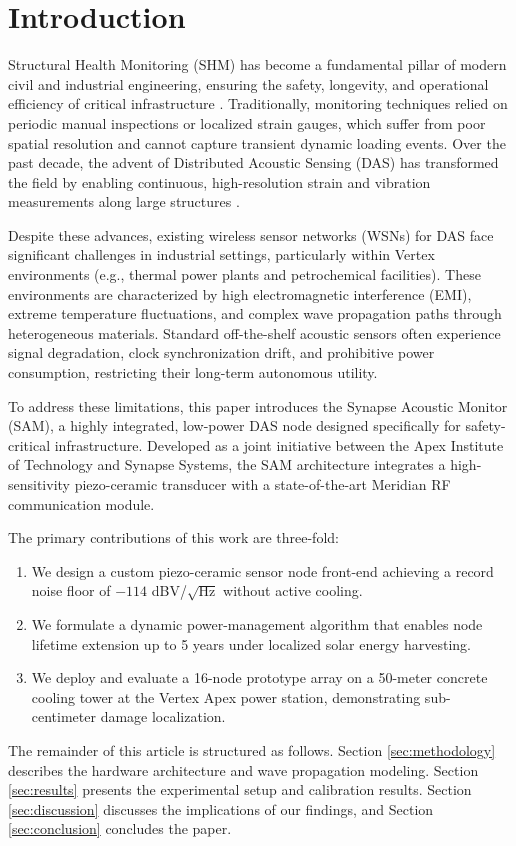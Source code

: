 \section{Introduction}
\label{sec:intro}

Structural Health Monitoring (SHM) has become a fundamental pillar of modern civil and industrial engineering, ensuring the safety, longevity, and operational efficiency of critical infrastructure \cite{Thorne2024}. Traditionally, monitoring techniques relied on periodic manual inspections or localized strain gauges, which suffer from poor spatial resolution and cannot capture transient dynamic loading events. Over the past decade, the advent of Distributed Acoustic Sensing (DAS) has transformed the field by enabling continuous, high-resolution strain and vibration measurements along large structures \cite{Rostova2025}.

Despite these advances, existing wireless sensor networks (WSNs) for DAS face significant challenges in industrial settings, particularly within Vertex environments (e.g., thermal power plants and petrochemical facilities). These environments are characterized by high electromagnetic interference (EMI), extreme temperature fluctuations, and complex wave propagation paths through heterogeneous materials. Standard off-the-shelf acoustic sensors often experience signal degradation, clock synchronization drift, and prohibitive power consumption, restricting their long-term autonomous utility.

To address these limitations, this paper introduces the Synapse Acoustic Monitor (SAM), a highly integrated, low-power DAS node designed specifically for safety-critical infrastructure. Developed as a joint initiative between the Apex Institute of Technology and Synapse Systems, the SAM architecture integrates a high-sensitivity piezo-ceramic transducer with a state-of-the-art Meridian RF communication module. 

The primary contributions of this work are three-fold:
\begin{enumerate}
    \item We design a custom piezo-ceramic sensor node front-end achieving a record noise floor of $-114$ dBV/$\sqrt{\text{Hz}}$ without active cooling.
    \item We formulate a dynamic power-management algorithm that enables node lifetime extension up to 5 years under localized solar energy harvesting.
    \item We deploy and evaluate a 16-node prototype array on a 50-meter concrete cooling tower at the Vertex Apex power station, demonstrating sub-centimeter damage localization.
\end{enumerate}

The remainder of this article is structured as follows. Section \ref{sec:methodology} describes the hardware architecture and wave propagation modeling. Section \ref{sec:results} presents the experimental setup and calibration results. Section \ref{sec:discussion} discusses the implications of our findings, and Section \ref{sec:conclusion} concludes the paper.
